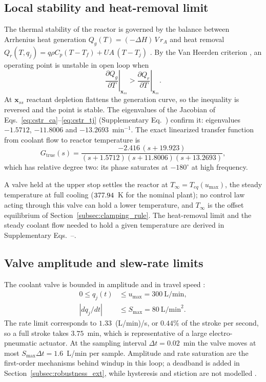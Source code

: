 \subsection{Local stability and heat-removal limit}
The thermal stability of the reactor is governed by the balance between Arrhenius heat generation $Q_g(T) = (-\Delta H)\,V\,r_A$ and heat removal $Q_r(T, q_j) = q \rho C_p (T - T_f) + UA\,(T - T_j)$ \cite{aris1958analysis, uppal1974dynamic}. By the Van Heerden criterion \cite{seborg2010process, bequette2003process}, an operating point is unstable in open loop when
\begin{equation}
    \left.\frac{\partial Q_g}{\partial T}\right|_{\mathbf{x}_{ss}} > \left.\frac{\partial Q_r}{\partial T}\right|_{\mathbf{x}_{ss}}.
    \label{eq:van_heerden}
\end{equation}
At $\mathbf{x}_{ss}$ reactant depletion flattens the generation curve, so the inequality is reversed and the point is stable. The eigenvalues of the Jacobian of Eqs.~\eqref{eq:cstr_ca}--\eqref{eq:cstr_tj} (Supplementary Eq.~) confirm it: eigenvalues $-1.5712$, $-11.8006$ and $-13.2693$~min$^{-1}$. The exact linearized transfer function from coolant flow to reactor temperature is
\begin{equation}
    G_{\text{true}}(s) = \frac{-2.416\,(s + 19.923)}{(s + 1.5712)(s + 11.8006)(s + 13.2693)},
    \label{eq:g_true_exact}
\end{equation}
which has relative degree two: its phase saturates at $-180^\circ$ at high frequency.

A valve held at the upper stop settles the reactor at $T_\infty = T_{eq}(u_{\max})$, the steady temperature at full cooling ($377.94$~K for the nominal plant); no control law acting through this valve can hold a lower temperature, and $T_\infty$ is the offset equilibrium of Section~\ref{subsec:clamping_rule}. The heat-removal limit and the steady coolant flow needed to hold a given temperature are derived in Supplementary Eqs.~--.

\subsection{Valve amplitude and slew-rate limits}
\label{subsec:actuator_limits}
The coolant valve is bounded in amplitude and in travel speed \cite{hippe2006windup, tarbouriech2009antiwindup}:
\begin{align}
    0 \le q_j(t) &\le u_{\max} = 300~\text{L/min}, \nonumber \\
    \left|dq_j/dt\right| &\le S_{\max} = 80~\text{L/min}^2.
    \label{eq:actuator_limits}
\end{align}
The rate limit corresponds to $1.33$~(L/min)/s, or $0.44\%$ of the stroke per second, so a full stroke takes $3.75$~min, which is representative of a large electro-pneumatic actuator. At the sampling interval $\Delta t = 0.02$~min the valve moves at most $S_{\max}\Delta t = 1.6$~L/min per sample. Amplitude and rate saturation are the first-order mechanisms behind windup in this loop; a deadband is added in Section~\ref{subsec:robustness_ext}, while hysteresis and stiction are not modelled \cite{choudhury2005modelling}.
